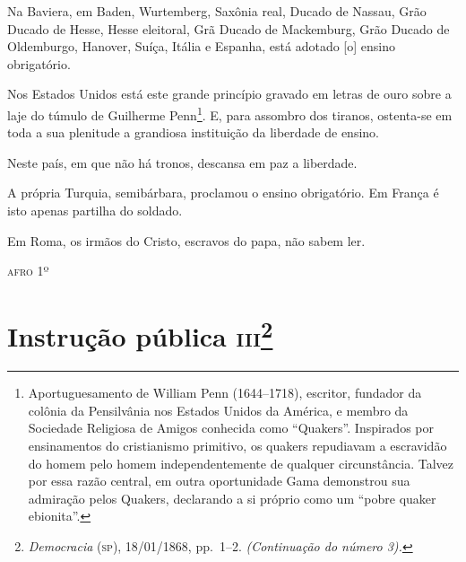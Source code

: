 Na Baviera, em Baden, Wurtemberg, Saxônia real, Ducado de Nassau, Grão
Ducado de Hesse, Hesse eleitoral, Grã Ducado de Mackemburg, Grão Ducado
de Oldemburgo, Hanover, Suíça, Itália e Espanha, está adotado {[}o{]}
ensino obrigatório.

Nos Estados Unidos está este grande princípio gravado em letras de ouro
sobre a laje do túmulo de Guilherme Penn\footnote{Aportuguesamento de
  William Penn (1644--1718), escritor, fundador da colônia da Pensilvânia
  nos Estados Unidos da América, e membro da Sociedade Religiosa de
  Amigos conhecida como ``Quakers''. Inspirados por ensinamentos do
  cristianismo primitivo, os quakers repudiavam a escravidão do homem
  pelo homem independentemente de qualquer circunstância. Talvez por
  essa razão central, em outra oportunidade Gama demonstrou sua
  admiração pelos Quakers, declarando a si próprio como um ``pobre quaker
  ebionita''.}. E, para assombro dos tiranos, ostenta-se em toda a sua
plenitude a grandiosa instituição da liberdade de ensino.

Neste país, em que não há tronos, descansa em paz a liberdade.

A própria Turquia, semibárbara, proclamou o ensino obrigatório. Em
França é isto apenas partilha do soldado.

Em Roma, os irmãos do Cristo, escravos do papa, não sabem ler.

\begin{flushright}
\textsc{afro} 1º
\end{flushright}

\chapter{Instrução pública \textsc{iii}\footnote{\emph{Democracia} (\textsc{sp}),
  18/01/1868, pp.~1--2. \emph{(Continuação do número 3).}}}

